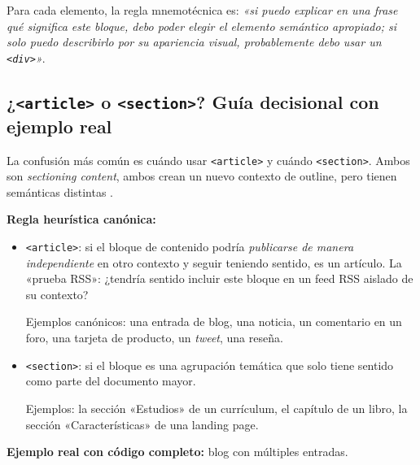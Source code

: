 \documentclass[11pt,a4paper,openany]{book}
\begin{document}
Para cada elemento, la regla mnemotécnica es: \emph{«si puedo
explicar en una frase qué significa este bloque, debo poder elegir
el elemento semántico apropiado; si solo puedo describirlo por su
apariencia visual, probablemente debo usar un \texttt{<div>}»}.

\subsection{¿\texttt{<article>} o \texttt{<section>}? Guía decisional con ejemplo real}

La confusión más común es cuándo usar \texttt{<article>} y cuándo
\texttt{<section>}. Ambos son \emph{sectioning content}, ambos
crean un nuevo contexto de outline, pero tienen semánticas distintas
\cite{lawson2011html5,robbins2018learning}.

\textbf{Regla heurística canónica:}

\begin{itemize}
\item \texttt{<article>}: si el bloque de contenido podría
\emph{publicarse de manera independiente} en otro contexto y seguir
teniendo sentido, es un artículo. La «prueba RSS»: ¿tendría sentido
incluir este bloque en un feed RSS aislado de su contexto?

Ejemplos canónicos: una entrada de blog, una noticia, un comentario
en un foro, una tarjeta de producto, un \emph{tweet}, una reseña.

\item \texttt{<section>}: si el bloque es una agrupación temática
que solo tiene sentido como parte del documento mayor.

Ejemplos: la sección «Estudios» de un currículum, el capítulo de un
libro, la sección «Características» de una landing page.
\end{itemize}

\textbf{Ejemplo real con código completo:} blog con múltiples entradas.
\end{document}

